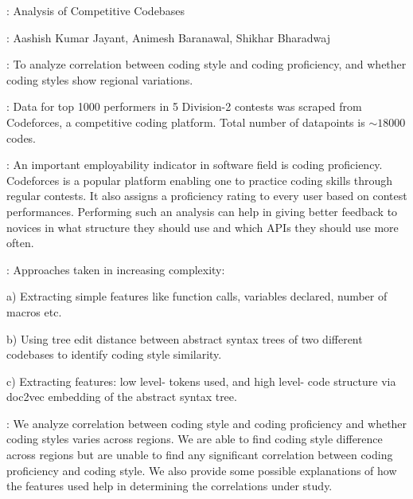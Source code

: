 \documentclass[12pt,a4paper]{article}
\begin{document}

: Analysis of Competitive Codebases

\vspace*{.5cm}

: Aashish Kumar Jayant, Animesh Baranawal, Shikhar Bharadwaj 

\vspace*{.5cm}

: To analyze correlation between coding style and coding proficiency, and whether coding styles show regional variations.

\vspace*{.5cm}

: Data for top 1000 performers in 5 Division-2 contests was scraped from Codeforces, a competitive coding platform. Total number of datapoints is $\sim 18000$ codes.   

\vspace*{.5cm}

: An important employability indicator in software field is coding proficiency. Codeforces is a popular platform enabling one to practice coding skills through regular contests. It also assigns a proficiency rating to every user based on contest performances. Performing such an analysis can help in giving better feedback to novices in what structure they should use and which APIs they should use more often. 

\vspace*{.5cm}

: Approaches taken in increasing complexity: 

a) Extracting simple features like function calls, variables declared, number of macros etc.   

b) Using tree edit distance between abstract syntax trees of two different codebases to identify coding style similarity.

c) Extracting features: low level- tokens used, and high level- code structure via doc2vec embedding of the abstract syntax tree. 

\vspace*{.5cm}

: We analyze correlation between coding style and coding proficiency and whether coding styles varies across regions. We are able to find coding style difference across regions but are unable to find any significant correlation between coding proficiency and coding style. We also provide some possible explanations of how the features used help in determining the correlations under study.
\end{document}
